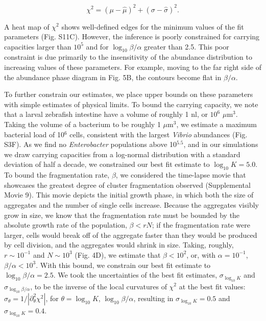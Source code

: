 \documentclass[12pt]{article}
\def\be{\begin{equation}}
\def\ee{\end{equation}}
\begin{document}
\be
\chi^2 = (\mu - \hat{\mu})^2 + (\sigma - \hat{\sigma})^2.
\ee

A heat map of $\chi^2$ shows well-defined edges for the minimum values of the fit parameters (Fig. S11C). However, the inference is poorly constrained for carrying capacities larger than $10^5$ and for $\log_{10} \beta/\alpha$  greater than 2.5. This poor constraint is due primarily to the insensitivity of the abundance distribution to increasing values of these parameters. For example, moving to the far right side of the abundance phase diagram in Fig. 5B, the contours become flat in $\beta/\alpha$. 

To further constrain our estimates, we place upper bounds on these parameters with simple estimates of physical limits. To bound the carrying capacity, we note that a larval zebrafish intestine have a volume of roughly 1 nl, or $10^6$ $\mu$m$^3$. Taking the volume of a bacterium to be roughly 1 $\mu$m$^3$, we estimate a maximum bacterial load of 10$^6$ cells, consistent with the largest \textit{Vibrio} abundances (Fig. S3F). As we find no \textit{Enterobacter} populations above 10$^{5.5}$, and in our simulations we draw carrying capacities from a log-normal distribution with a standard deviation of half a decade, we constrained our best fit estimate to $\log_{10}K = 5.0$. To bound the fragmentation rate, $\beta$, we considered the time-lapse movie that showcases the greatest degree of cluster fragmentation observed (Supplemental Movie 9). This movie depicts the initial growth phase, in which both the size of aggregates and the number of single cells increase. Because the aggregates visibly grow in size, we know that the fragmentation rate must be bounded by the absolute growth rate of the population, $\beta < rN$; if the fragmentation rate were larger, cells would break off of the aggregate faster than they would be produced by cell division, and the aggregates would shrink in size. Taking, roughly, $r\sim 10^{-1}$ and $N\sim 10^3$ (Fig. 4D), we estimate that $\beta < 10^2$, or, with $\alpha = 10^{-1}$, $\beta/\alpha < 10^3$. With this bound, we constrain our best fit estimate to $\log_{10}\beta/\alpha = 2.5$. We took the uncertainties of the best fit estimates, $\sigma_{\log_{10}K}$ and $\sigma_{\log_{10}\beta/\alpha}$, to be the inverse of the local curvatures of $\chi^2$ at the best fit values: $\sigma_{\theta} = 1/|\partial^2_{\theta}\chi^2|$, for $\theta = \log_{10}K$, $\log_{10}\beta/\alpha$, resulting in $\sigma_{\log_{10}K} = 0.5$ and $\sigma_{\log_{10}K} = 0.4$.
 
\end{document}
